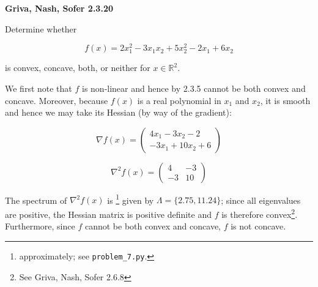 \textbf{Griva, Nash, Sofer 2.3.20}

Determine whether

$$
  f(x) = 2x_1^2 - 3 x_1 x_2 + 5 x_2^2 - 2 x_1 + 6 x_2
$$

is convex, concave, both, or neither for $x \in \mathbb{R}^2$.

\begin{solution}
  We first note that $f$ is non-linear and hence by 2.3.5 cannot be both convex and concave.
  Moreover, because $f(x)$ is a real polynomial in $x_1$ and $x_2$, it is smooth and hence 
  we may take its Hessian (by way of the gradient):
  
  $$
    \nabla f(x) = \begin{pmatrix}
      4x_1 - 3x_2 - 2 \\
      -3x_1 + 10x_2 + 6
    \end{pmatrix}
  $$

  $$
    \nabla^2 f(x) = \begin{pmatrix}
      4  & -3 \\
      -3 & 10
    \end{pmatrix}
  $$

  The spectrum of $\nabla^2 f(x)$ is \footnote{
    approximately; see \texttt{problem\_7.py}.
  } given by $\Lambda = \{2.75, 11.24 \}$; since all eigenvalues are positive, 
  the Hessian matrix is positive definite and $f$ is therefore convex\footnote{
    See Griva, Nash, Sofer 2.6.8
  }. Furthermore, since $f$ cannot be both convex and concave, $f$ is not concave.
  \ \\
\end{solution}